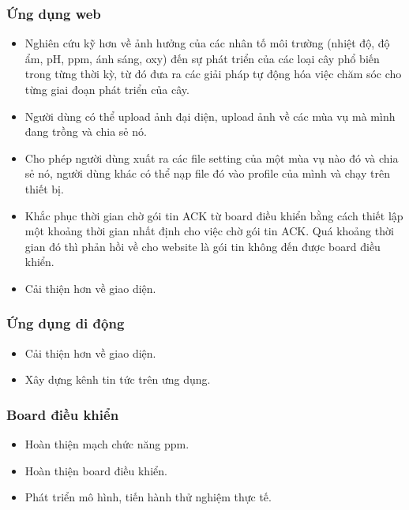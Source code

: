 \documentclass[a4paper,12pt,oneside]{article}
\begin{document}
\subsubsection{Ứng dụng web}
\begin{itemize}
\item Nghiên cứu kỹ hơn về ảnh hưởng của các nhân tố môi trường (nhiệt độ, độ ẩm, pH, ppm, ánh sáng, oxy) đến sự phát triển của các loại cây phổ biến trong từng thời kỳ, từ đó đưa ra các giải pháp tự động hóa việc chăm sóc cho từng giai đoạn phát triển của cây.
\item Người dùng có thể upload ảnh đại diện, upload ảnh về các mùa vụ mà mình đang trồng và chia sẻ nó.
\item Cho phép người dùng xuất ra các file setting của một mùa vụ nào đó và chia sẻ nó, người dùng khác có thể nạp file đó vào profile của mình và chạy trên thiết bị.
\item Khắc phục thời gian chờ gói tin ACK từ board điều khiển bằng cách thiết lập một khoảng thời gian nhất định cho việc chờ gói tin ACK. Quá khoảng thời gian đó thì phản hồi về cho website là gói tin không đến được board điều khiển.
\item Cải thiện hơn về giao diện.
\end{itemize}

\subsubsection{Ứng dụng di động}
\begin{itemize}
\item Cải thiện hơn về giao diện.
\item Xây dựng kênh tin tức trên ưng dụng.
\end{itemize}

\subsubsection{Board điều khiển}
\begin{itemize}
\item Hoàn thiện mạch chức năng ppm.
\item Hoàn thiện board điều khiển.
\item Phát triển mô hình, tiến hành thử nghiệm thực tế.
\end{itemize}
\newpage
\end{document}
